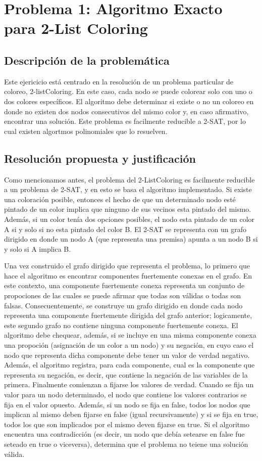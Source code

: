\newpage
\section{Problema 1: Algoritmo Exacto para 2-List Coloring}

\subsection{Descripción de la problemática}
Este ejericicio está centrado en la resolución de un problema particular de coloreo, 2-listColoring. En este caso, cada nodo se puede colorear solo con uno o dos colores específicos. El algoritmo debe determinar si existe o no un coloreo en donde no existen dos nodos consecutivos del mismo color y, en caso afirmativo, encontrar una solución.
Este problema es facilmente reducible a 2-SAT, por lo cual existen algortmos polinomiales que lo resuelven.

\subsection{Resolución propuesta y justificación}
Como mencionamos antes, el problema del 2-ListColoring es facilmente reducible a un problema de 2-SAT, y en esto se basa el algoritmo implementado. Si existe una coloración posible, entonces el hecho de que un determinado nodo esté pintado de un color implica que ninguno de sus vecinos esta pintado del mismo. Además, si un color tenía dos opciones posibles, el nodo esta pintado de un color A si y solo si no esta pintado del color B.
El 2-SAT se representa con un grafo dirigido en donde un nodo A (que representa una premisa) apunta a un nodo B si y solo si A implica B.

Una vez construido el grafo dirigido que representa el problema, lo primero que hace el algoritmo es encontrar componentes fuertemente conexas en el grafo. En este contexto, una componente fuertemente conexa representa un conjunto de propociones de las cuales se puede afirmar que todas son válidas o todas son falsas. Consecuentemente, se construye un grafo dirigido en donde cada nodo representa una componente fuertemente dirigida del grafo anterior; logicamente, este segundo grafo no contiene ninguna componente fuertemente conexa. 
El algoritmo debe chequear, además, si se incluye en una misma componente conexa una propoción (asignación de un color a un nodo) y su negación, en cuyo caso el nodo que representa dicha componente debe tener un valor de verdad negativo. Además, el algoritmo registra, para cada componente, cual es la componente que representa su negación, es decir, que contiene la negación de las variables de la primera.
Finalmente comienzan a fijarse los valores de verdad. Cuando se fija un valor para un nodo determinado, el nodo que contiene los valores contrarios se fija en el valor opuesto. Además, si un nodo se fija en false, todos los nodos que implican al mismo deben fijarse en false (igual recursivamente) y si se fija en true, todos los que son implicados por el mismo deven fijarse en true. Si el algoritmo encuentra una contradicción (es decir, un nodo que debía setearse en false fue seteado en true o viceversa), determina que el problema no teiene una solución válida.


